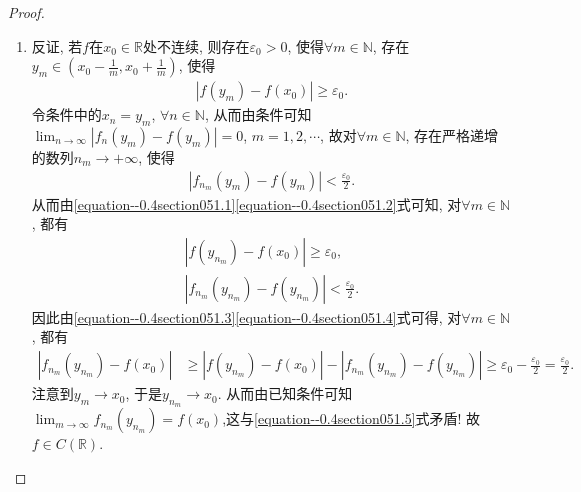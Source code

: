 \documentclass[../../main.tex]{subfiles}
\begin{document}
\begin{proof}
\begin{enumerate}
\item 反证, 若\(f\)在\(x_0\in \mathbb{R}\)处不连续, 则存在\(\varepsilon_0 > 0\), 使得\(\forall m\in \mathbb{N}\), 存在\(y_m\in (x_0 - \frac{1}{m}, x_0 + \frac{1}{m})\), 使得
\begin{align}
|f(y_m) - f(x_0)| \geqslant \varepsilon_0. \label{equation--0.4section051.1}
\end{align}
令条件中的\(x_n= y_m\), \(\forall n\in \mathbb{N}\), 从而由条件可知\(\lim_{n\rightarrow \infty}|f_n(y_m) - f(y_m)| = 0\), \(m = 1,2,\cdots\),
故对\(\forall m\in \mathbb{N}\), 存在严格递增的数列\(n_m\rightarrow +\infty\), 使得
\begin{align}
|f_{n_m}(y_m) - f(y_m)| < \frac{\varepsilon_0}{2}. \label{equation--0.4section051.2}
\end{align}
从而由\eqref{equation--0.4section051.1}\eqref{equation--0.4section051.2}式可知, 对\(\forall m\in \mathbb{N}\), 都有
\begin{gather}
|f(y_{n_m}) - f(x_0)| \geqslant \varepsilon_0, \label{equation--0.4section051.3}\\
|f_{n_m}(y_{n_m}) - f(y_{n_m})| < \frac{\varepsilon_0}{2}. \label{equation--0.4section051.4}
\end{gather}
因此由\eqref{equation--0.4section051.3}\eqref{equation--0.4section051.4}式可得, 对\(\forall m\in \mathbb{N}\), 都有
\begin{align}
|f_{n_m}(y_{n_m}) - f(x_0)| &\geqslant |f(y_{n_m}) - f(x_0)| - |f_{n_m}(y_{n_m}) - f(y_{n_m})| \geqslant \varepsilon_0 - \frac{\varepsilon_0}{2} = \frac{\varepsilon_0}{2}. \label{equation--0.4section051.5}
\end{align}
注意到\(y_m\rightarrow x_0\), 于是\(y_{n_m}\rightarrow x_0\). 从而由已知条件可知\(\lim_{m\rightarrow \infty}f_{n_m}(y_{n_m}) = f(x_0)\),这与\eqref{equation--0.4section051.5}式矛盾! 故\(f\in C(\mathbb{R})\). 
\end{enumerate}

\end{proof}
\end{document}
